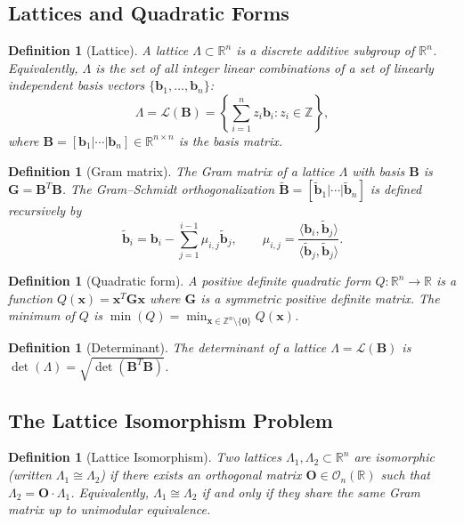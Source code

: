 \documentclass[11pt,a4paper]{article}
\newtheorem{definition}[theorem]{Definition}
\newcommand{\Z}{\mathbb{Z}}
\newcommand{\R}{\mathbb{R}}
\begin{document}
\subsection{Lattices and Quadratic Forms}\label{sec:lattices}

\begin{definition}[Lattice]
A \emph{lattice} $\Lambda \subset \R^n$ is a discrete additive subgroup of $\R^n$. Equivalently, $\Lambda$ is the set of all integer linear combinations of a set of linearly independent basis vectors $\{\mathbf{b}_1, \ldots, \mathbf{b}_n\}$:
\[
\Lambda = \mathcal{L}(\mathbf{B}) = \left\{ \sum_{i=1}^{n} z_i \mathbf{b}_i : z_i \in \Z \right\},
\]
where $\mathbf{B} = [\mathbf{b}_1 | \cdots | \mathbf{b}_n] \in \R^{n \times n}$ is the basis matrix.
\end{definition}

\begin{definition}[Gram matrix]
The \emph{Gram matrix} of a lattice $\Lambda$ with basis $\mathbf{B}$ is $\mathbf{G} = \mathbf{B}^T \mathbf{B}$. The \emph{Gram--Schmidt orthogonalization} $\widetilde{\mathbf{B}} = [\widetilde{\mathbf{b}}_1 | \cdots | \widetilde{\mathbf{b}}_n]$ is defined recursively by
\[
\widetilde{\mathbf{b}}_i = \mathbf{b}_i - \sum_{j=1}^{i-1} \mu_{i,j} \widetilde{\mathbf{b}}_j, \qquad \mu_{i,j} = \frac{\langle \mathbf{b}_i, \widetilde{\mathbf{b}}_j \rangle}{\langle \widetilde{\mathbf{b}}_j, \widetilde{\mathbf{b}}_j \rangle}.
\]
\end{definition}

\begin{definition}[Quadratic form]
A \emph{positive definite quadratic form} $Q: \R^n \to \R$ is a function $Q(\mathbf{x}) = \mathbf{x}^T \mathbf{G} \mathbf{x}$ where $\mathbf{G}$ is a symmetric positive definite matrix. The \emph{minimum} of $Q$ is $\min(Q) = \min_{\mathbf{x} \in \Z^n \setminus \{\mathbf{0}\}} Q(\mathbf{x})$.
\end{definition}

\begin{definition}[Determinant]
The \emph{determinant} of a lattice $\Lambda = \mathcal{L}(\mathbf{B})$ is $\det(\Lambda) = \sqrt{\det(\mathbf{B}^T \mathbf{B})}$.
\end{definition}

\subsection{The Lattice Isomorphism Problem}\label{sec:lip}

\begin{definition}[Lattice Isomorphism]
Two lattices $\Lambda_1, \Lambda_2 \subset \R^n$ are \emph{isomorphic} (written $\Lambda_1 \cong \Lambda_2$) if there exists an orthogonal matrix $\mathbf{O} \in \mathcal{O}_n(\R)$ such that $\Lambda_2 = \mathbf{O} \cdot \Lambda_1$. Equivalently, $\Lambda_1 \cong \Lambda_2$ if and only if they share the same Gram matrix up to unimodular equivalence.
\end{definition}
\end{document}
